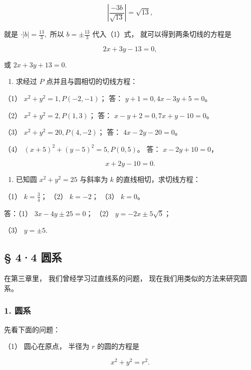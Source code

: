 \[
\left| \frac {- 3 b}{\sqrt {13}} \right| = \sqrt {13},
\]

就是 \(\cdot |b| = \frac{13}{3},\) 所以 \(b = \pm \frac{13}{3}\)
代入（1）式， 就可以得到两条切线的方程是

\[
2 x + 3 y - 13 = 0,
\]

或 \(2x + 3y + 13 = 0.\)

\begin{enumerate}
\def\labelenumi{\arabic{enumi}.}
\tightlist
\item
  求经过 \(P\) 点并且与圆相切的切线方程：
\end{enumerate}

（1） \(x^{2} + y^{2} = 1, P(-2, -1)\)； 答：
\(y + 1 = 0, 4x - 3y + 5 = 0\)。

（2） \(x^{2} + y^{2} = 2, P(1,3)\)； 答：
\(x - y + 2 = 0, 7x + y - 10 = 0\)。

（3） \(x^{2} + y^{2} = 20, P(4, -2)\)； 答： \(4x - 2y - 20 = 0\)。

（4） \((x + 5)^{2} + (y - 5)^{2} = 5, P(0,5)\)。 答：
\(x - 2y + 10 = 0\)，

\[
x + 2 y - 10 = 0.
\]

\begin{enumerate}
\def\labelenumi{\arabic{enumi}.}
\setcounter{enumi}{1}
\tightlist
\item
  已知圆 \(x^{2} + y^{2} = 25\) 与斜率为 \(k\) 的直线相切，求切线方程：
\end{enumerate}

（1） \(k = \frac{3}{4}\)； （2） \(k = -2\)； （3） \(k = 0\)。

答：（1） \(3x - 4y \pm 25 = 0\)； （2） \(y = -2x \pm 5\sqrt{5}\)；

（3） \(y = \pm 5.\)

\subsection{§ 4·4 圆系}\label{ux5706ux7cfb}

在第三章里， 我们曾经学习过直线系的问题，
现在我们用类似的方法来研究圆系。

\subsubsection{1. 圆系}\label{ux5706ux7cfb-1}

先看下面的问题：

（1） 圆心在原点， 半径为 \(r\) 的圆的方程是

\[
x^{2} + y^{2} = r^{2}. \tag {1}
\]


